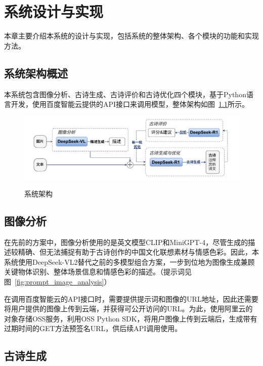 
\chapter{系统设计与实现}

本章主要介绍本系统的设计与实现，包括系统的整体架构、各个模块的功能和实现方法。

\section{系统架构概述}
本系统包含图像分析、古诗生成、古诗评价和古诗优化四个模块，基于Python语言开发，使用百度智能云提供的API接口来调用模型，整体架构如图~\ref{fig:system_architecture}所示。

\begin{figure}[h]
    \centering
    \includegraphics[width=1\textwidth]
    {figures/系统架构.pdf}\\
    \caption{系统架构}
    \label{fig:system_architecture}
  \end{figure}

\section{图像分析}

在先前的方案中，图像分析使用的是英文模型CLIP和MiniGPT-4，尽管生成的描述较精确、但无法捕捉有助于古诗创作的中国文化联想素材与情感色彩。因此，本系统使用DeepSeek-VL2\cite{wuDeepSeekVL2MixtureofExpertsVisionLanguage2024}替代之前的多模型组合方案，一步到位地为图像生成兼顾关键物体识别、整体场景信息和情感色彩的描述。（提示词见图~\ref{fig:prompt_image_analysis}）

在调用百度智能云的API接口时，需要提供提示词和图像的URL地址，因此还需要将用户提供的图像上传到云端，并获得可公开访问的URL。为此，使用阿里云的对象存储OSS服务，利用OSS Python SDK，将用户图像上传到云端后，生成带有过期时间的GET方法预签名URL，供后续API调用使用。

\section{古诗生成}

